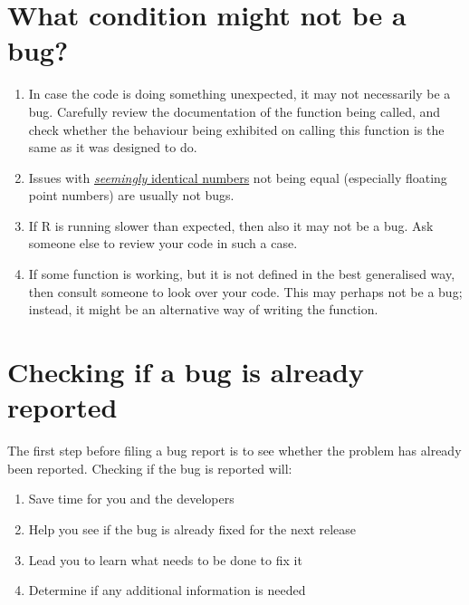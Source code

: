 \documentclass[
]{book}
\begin{document}
\hypertarget{what-condition-might-not-be-a-bug}{%
\section{What condition might not be a bug?}\label{what-condition-might-not-be-a-bug}}

\begin{enumerate}
\def\labelenumi{\arabic{enumi}.}
\item
  In case the code is doing something unexpected, it may not necessarily be a bug. Carefully review the documentation of the function being called, and check whether the behaviour being exhibited on calling this function is the same as it was designed to do.
\item
  Issues with \href{https://cran.r-project.org/doc/FAQ/R-FAQ.html\#Why-doesn_0027t-R-think-these-numbers-are-equal_003f}{\emph{seemingly} identical numbers} not being equal (especially floating point numbers) are usually not bugs.
\item
  If R is running slower than expected, then also it may not be a bug. Ask someone else to review your code in such a case.
\item
  If some function is working, but it is not defined in the best generalised way, then consult someone to look over your code. This may perhaps not be a bug; instead, it might be an alternative way of writing the function.
\end{enumerate}

\hypertarget{checking-if-a-bug-is-already-reported}{%
\section{Checking if a bug is already reported}\label{checking-if-a-bug-is-already-reported}}

The first step before filing a bug report is to see whether the problem has already been reported. Checking if the bug is reported will:

\begin{enumerate}
\def\labelenumi{\arabic{enumi}.}
\item
  Save time for you and the developers
\item
  Help you see if the bug is already fixed for the next release
\item
  Lead you to learn what needs to be done to fix it
\item
  Determine if any additional information is needed
\end{enumerate}
\end{document}
